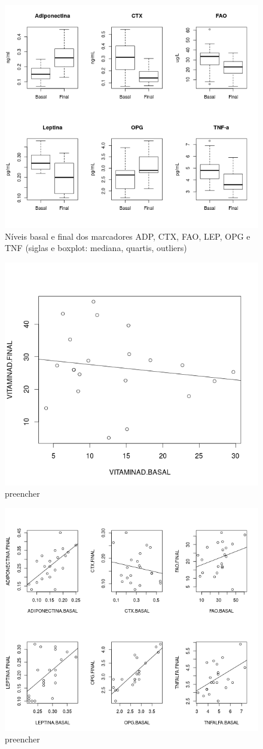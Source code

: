 \documentclass[a4paper]{article}
\begin{document}
\begin{figure}[!h]
  \centering
  \includegraphics[width=.5\textwidth]{../figuras/boxplots}
  \caption[Níveis basal e final dos marcadores ADP, CTX, FAO, LEP, OPG e TNF]{Níveis basal e final dos marcadores ADP, CTX, FAO, LEP, OPG e TNF (siglas e boxplot: mediana, quartis, outliers)}
  \label{fig:marcadores-boxplot}
\end{figure}

\begin{figure}[!h]
  \centering
  \includegraphics[width=.5\textwidth]{../figuras/vitd-scatter}
  \caption{preencher}
  \label{fig:vitd-scatter}
\end{figure}

\begin{figure}[!h]
  \centering
  \includegraphics[width=.5\textwidth]{../figuras/scatterplots}
  \caption{preencher}
  \label{fig:marcadores-scatter}
\end{figure}
\end{document}
